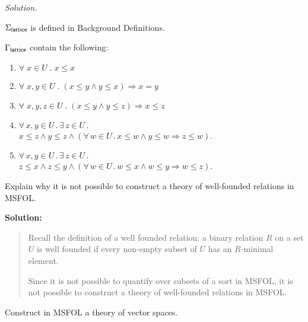 \documentclass[11pt,fleqn]{article}
\newcommand{\be}{\begin{enumerate}}
\newcommand{\ee}{\end{enumerate}}
\renewcommand{\And}{\wedge}
\newcommand{\And}{\wedge}
\newcommand{\Implies}{\Rightarrow}
\newcommand{\ForallApp}{\forall\,}
\newcommand{\ForsomeApp}{\exists\,}
\newcommand{\mdot}{\mathrel.}
\begin{document}
  \textit{Solution.}

\qquad $\Sigma_{\sf lattice}$ is defined in Background Definitions.

\qquad $\Gamma_{\sf lattice}$ contain the following:

  \be
	\item $\forall \; x \in U \;.\; x \le x$

	\item $\forall \; x, y \in U \;.\; (x \le y \land y \le x) \Rightarrow  x = y$

	\item $\forall \; x, y, z \in U \;.\; (x \le y \land y \le z) \Rightarrow x \le z$

	\item $\ForallApp x,y \in U \mdot \ForsomeApp z \in U \mdot$\\
          \hspace*{2ex}$x \le z \And y \le z \And (\ForallApp w \in U
          \mdot x \le w \And y \le w \Implies z \le w)$.

	\item $\ForallApp x,y \in U \mdot \ForsomeApp z \in U \mdot$\\
          \hspace*{2ex}$z \le x \And z \le y \And (\ForallApp w \in U
          \mdot w \le x \And w \le y \Implies w \le z)$.

  \ee

  \item Explain why it is not possible to construct a theory of
    well-founded relations in MSFOL.

\textbf{Solution:}
\begin{quote}
  Recall the definition of a well founded relation: a binary relation $R$ on a set $U$ is well founded if every non-empty subset of $U$ has an $R$-minimal element.

  Since it is not possible to quantify over subsets of a sort in MSFOL, it is not possible to construct a theory of well-founded relations in MSFOL.
\end{quote}

  \item Construct in MSFOL a theory of vector spaces.
\end{document}

